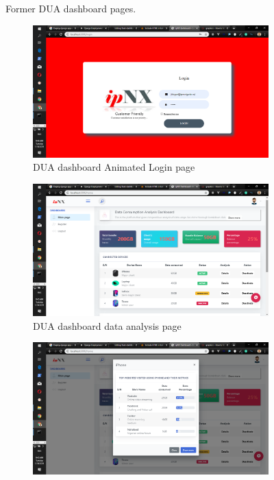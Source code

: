 \begin{itemize}
\begin{figure}[!htbp]
		\caption{Former DUA dashboard pages.}
	\end{figure}
	\begin{figure}[!htbp]
		\centering
		\begin{subfigure}[b]{0.45\textwidth}
			\centering
			\includegraphics[width=\linewidth]{./dualogin}
			\caption{DUA dashboard Animated Login page}
		\end{subfigure}
		\hfill
		\begin{subfigure}[b]{0.45\textwidth}
			\centering
			\includegraphics[width=\linewidth]{./duadata}
			\caption{DUA dashboard data analysis page}
		\end{subfigure}
	\medskip
	\begin{subfigure}[b]{0.45\textwidth}
		\centering
		\includegraphics[width=\linewidth]{./duamodal}

\end{subfigure}
\end{figure}
\end{itemize}
